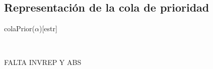 \subsection{Representación de la cola de prioridad}
\begin{Representacion}
  
  \begin{Estructura}{colaPrior($\alpha$)}[estr]

  \begin{Tupla}[estr]
  \end{Tupla}

  ~

  \begin{Tupla}[nodo]
  \end{Tupla}

  \end{Estructura}


  
FALTA INVREP Y ABS



\end{Representacion}






\begin{Algoritmos}





\end{Algoritmos}











